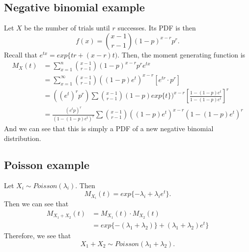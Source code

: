 \documentclass[titlepage, 12pt, leqno]{article}
\begin{document}
\subsection{Negative binomial example}
Let $X$ be the number of trials until $r$ successes. Its PDF is then
\[
    f(x) = \binom{x-1}{r-1}(1-p)^{x-r}p^{r}.
\]
Recall that $e^{tx} = exp\{tr + (x-r)t)$. Then, the moment generating function is
\begin{align*}
    M_{X}(t) 
    &= \sum_{x=1}^{n}\binom{x-1}{r-1}(1-p)^{x-r}p^{r}e^{tx} \\
    &= \sum_{x=1}^{\infty}\binom{x-1}{r-1}((1-p)e^{t})^{x-r} \left[e^{tr}\cdot
    p^{r}\right] \\
    &= ((e^{t})^{r}p^{r}) \sum \binom{x-1}{r-1}(1-p)exp\{t\})^{x-r}
    \left[\frac{1-(1-p)e^{t}}{1-(1-p)e^{t}}\right]^{r} \\
    &= \frac{(e^{t}p)^{r}}{(1-(1-p)e^{t})^{r}} \sum 
    \binom{x-1}{r-1}((1-p)e^{t})^{x-r}(1-(1-p)e^{t})^{r}
\end{align*}
And we can see that this is simply a PDF of a new negative binomial 
distribution.

\subsection{Poisson example}
Let $X_{i} \sim Poisson(\lambda_{i})$. Then
\[
    M_{X_{i}}(t) = exp\{-\lambda_{i}+ \lambda_{i}e^{t}\}.
\]
Then we can see that
\begin{align*}
    M_{X_{1} + X_{2}}(t) 
    &= M_{X_{1}}(t) \cdot M_{X_{2}}(t) \\
    &= exp\{-(\lambda_{1} + \lambda_{2})\} + (\lambda_{1} + \lambda_{2})
    e^{t}\}
\end{align*}
Therefore, we see that
\[
    X_{1} + X_{2} \sim Poisson(\lambda_{1} + \lambda_{2}).
\]
\end{document}
